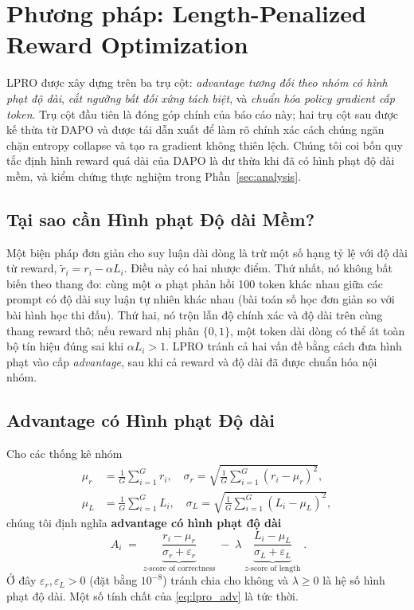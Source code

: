 \documentclass[11pt,a4paper]{article}
\begin{document}
\section{Phương pháp: Length-Penalized Reward Optimization}\label{sec:method}

LPRO được xây dựng trên ba trụ cột: \emph{advantage tương đối theo nhóm có hình phạt độ dài},
\emph{cắt ngưỡng bất đối xứng tách biệt}, và \emph{chuẩn hóa policy gradient
cấp token}. Trụ cột đầu tiên là đóng góp chính của báo cáo này; hai trụ cột sau
được kế thừa từ DAPO và được tái dẫn xuất để làm rõ chính xác cách chúng ngăn chặn
entropy collapse và tạo ra gradient không thiên lệch. Chúng tôi coi bốn quy tắc
định hình reward quá dài của DAPO là dư thừa khi đã có hình phạt độ dài mềm, và
kiểm chứng thực nghiệm trong Phần~\ref{sec:analysis}.

\subsection{Tại sao cần Hình phạt Độ dài Mềm?}

Một biện pháp đơn giản cho suy luận dài dòng là trừ một số hạng tỷ lệ với độ dài
từ reward, \(\tilde r_i = r_i - \alpha L_i\). Điều này có hai nhược điểm. Thứ nhất, nó không bất biến theo thang đo: cùng một \(\alpha\) phạt phản hồi 100 token khác nhau giữa
các prompt có độ dài suy luận tự nhiên khác nhau (bài toán số học đơn giản so với
bài hình học thi đấu). Thứ hai, nó trộn lẫn độ chính xác và độ dài trên cùng thang reward
thô; nếu reward nhị phân \(\{0,1\}\), một token dài dòng có thể át toàn bộ tín hiệu
đúng sai khi \(\alpha L_i>1\). LPRO tránh cả hai vấn đề bằng cách đưa hình phạt vào
cấp \emph{advantage}, sau khi cả reward và độ dài đã được chuẩn hóa nội nhóm.

\subsection{Advantage có Hình phạt Độ dài}\label{sec:length_pen_adv}

Cho các thống kê nhóm
\begin{align}
  \mu_r &= \tfrac{1}{G}\sum_{i=1}^G r_i,\quad
  \sigma_r = \sqrt{\tfrac{1}{G}\sum_{i=1}^G (r_i-\mu_r)^2},
  \label{eq:reward_stats} \\[2pt]
  \mu_L &= \tfrac{1}{G}\sum_{i=1}^G L_i,\quad
  \sigma_L = \sqrt{\tfrac{1}{G}\sum_{i=1}^G (L_i-\mu_L)^2},
  \label{eq:length_stats}
\end{align}
chúng tôi định nghĩa \textbf{advantage có hình phạt độ dài}
\begin{equation}
  \boxed{\;
  A_i \;=\;
  \underbrace{\frac{r_i-\mu_r}{\sigma_r+\varepsilon_r}}_{\displaystyle z\text{-score of correctness}}
  \;-\;
  \lambda\;
  \underbrace{\frac{L_i-\mu_L}{\sigma_L+\varepsilon_L}}_{\displaystyle z\text{-score of length}}
  \;}.
\label{eq:lpro_adv}
\end{equation}
Ở đây \(\varepsilon_r,\varepsilon_L>0\) (đặt bằng \(10^{-8}\)) tránh chia cho không và
\(\lambda\ge 0\) là hệ số hình phạt độ dài. Một số tính chất của
\eqref{eq:lpro_adv} là tức thời.
\end{document}
